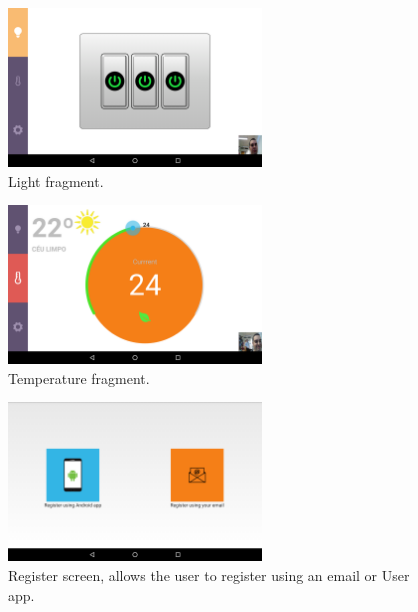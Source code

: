 %





\begin{figure}[H]
\centering
\includegraphics[width=0.6\textwidth]{Figures/screen_lights}
\caption{Light fragment.}
\label{screen_lights}
\end{figure}


\begin{figure}[H]
\centering
\includegraphics[width=0.6\textwidth]{Figures/screen_temperature}
\caption{Temperature fragment.}
\label{screen_temperature}
\end{figure}



\begin{figure}[H]
\centering
\includegraphics[width=0.6\textwidth]{Figures/hub_register}
\caption{Register screen, allows the user to register using an email or User app.}
\label{screen_hub_register}
\end{figure}

